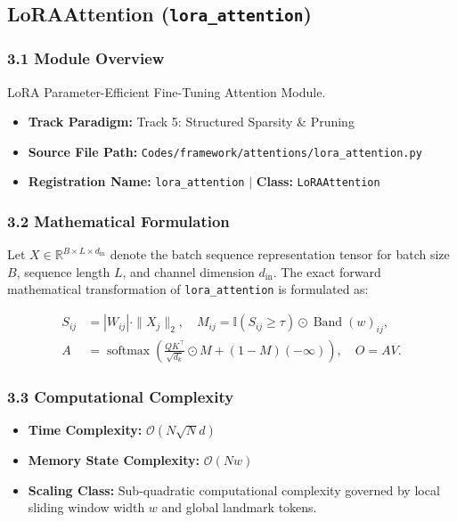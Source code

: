 \subsection{LoRAAttention (\texttt{lora\_attention})}
\label{sec:app_module_lora_attention}

\subsubsection*{3.1 Module Overview}
LoRA Parameter-Efficient Fine-Tuning Attention Module.
\begin{itemize}
    \item \textbf{Track Paradigm:} Track 5: Structured Sparsity \& Pruning
    \item \textbf{Source File Path:} \texttt{Codes/framework/attentions/lora\_attention.py}
    \item \textbf{Registration Name:} \texttt{lora\_attention} $\mid$ \textbf{Class:} \texttt{LoRAAttention}
\end{itemize}

\subsubsection*{3.2 Mathematical Formulation}
Let $X \in \mathbb{R}^{B \times L \times d_{\text{in}}}$ denote the batch sequence representation tensor for batch size $B$, sequence length $L$, and channel dimension $d_{\text{in}}$. The exact forward mathematical transformation of \texttt{lora\_attention} is formulated as:

\begin{align}
S_{ij} &= |W_{ij}| \cdot \|X_j\|_2, \quad M_{ij} = \mathbb{I}(S_{ij} \ge \tau) \odot \operatorname{Band}(w)_{ij}, \\
A &= \operatorname{softmax}\left(\frac{Q K^\top}{\sqrt{d_k}} \odot M + (1 - M)(-\infty)\right), \quad O = A V.
\end{align}


\subsubsection*{3.3 Computational Complexity}
\begin{itemize}
    \item \textbf{Time Complexity:} $\mathcal{O}(N \sqrt{N} d)$
    \item \textbf{Memory State Complexity:} $\mathcal{O}(N w)$
    \item \textbf{Scaling Class:} Sub-quadratic computational complexity governed by local sliding window width $w$ and global landmark tokens.
\end{itemize}

